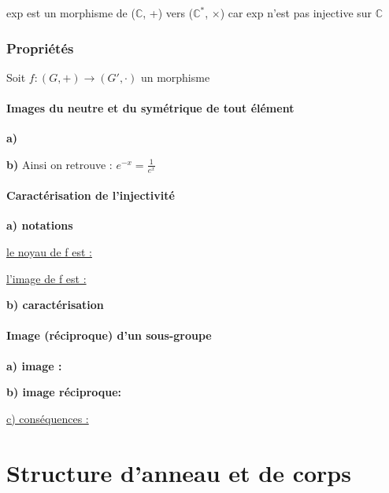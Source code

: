 \documentclass[12pt,a4paper,french]{book}
\begin{document}
\begin{spacing}{1.0}
		exp est un morphisme de ($\mathbb{C}$, +) vers ($\mathbb{C}^* $, $\times$) car exp n'est pas injective sur $\mathbb{C}$
		\subsection{Propriétés}
		Soit $f : (G, +) \rightarrow (G', \cdot)$ un morphisme
		
		\subsubsection{Images du neutre et du symétrique de tout élément}
		\textbf{a)} 
		
		\textbf{b)} 
		Ainsi on retrouve : $e^{-x} = \frac{1}{e^x}$
		
		\subsubsection{Caractérisation de l'injectivité}
		\textbf{a) notations}
		
			\underline{le noyau de f est :} 
			
			\underline{l'image de f est :} 
			
		\textbf{b) caractérisation}
		
		
		\subsubsection{Image (réciproque) d'un sous-groupe}
		\textbf{a) image :}
		
		
		\textbf{b) image réciproque:}
		
		
		\underline{c) conséquences :}
		
		
		
\chapter{Structure d'anneau et de corps}

\end{spacing}
\end{document}
